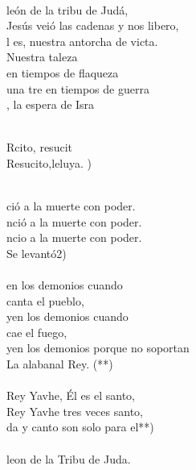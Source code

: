 \begin{cancion}%
	     \chord{(}{**)}{    }\\
	león de la tribu de Judá,\\
	Jesús veió las cadenas y nos libero,\\
	l es, nuestra antorcha de victa.\\
	Nuestra taleza \\
en tiempos de flaqueza \\
	una tre en tiempos de guerra\\
	, la espera de Isra\\\jump\\
	\begin{chorus}%
	Rcito, resucit \\
	Resucito,leluya. )\\
	\end{chorus}%
	\jump\\
	ció a la muerte con poder.\\
	nció a la muerte con poder.\\
	ncio a la muerte con poder.\\
	Se levantó2) \\
\jump\\
	en los demonios cuando \\
canta el pueblo,\\
	yen los demonios cuando \\
cae el fuego,\\
	yen los demonios porque no soportan\\
	La alabanal Rey. (**)\\
\jump\\
	 Rey Yavhe, Él es el santo,\\
	 Rey Yavhe tres veces santo,\\
	da y canto son solo para el**)\\
\jump\\
	leon de la Tribu de Juda.\\
\end{cancion}%
